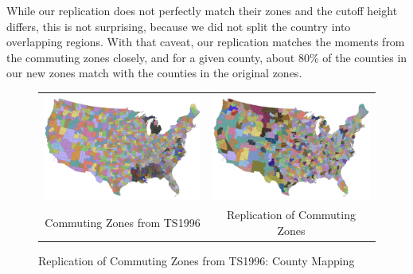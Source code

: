 While our replication does not perfectly match their zones and the cutoff height differs, this is not surprising, because we did not split the country into overlapping regions. With that caveat, our replication matches the moments from the commuting zones closely, and for a given county, about 80\% of the counties in our new zones match with the counties in the original zones.
\begin{figure}[tbh]\centering
\begin{tabular}{cc}
\includegraphics[scale=0.25]{./figures/commutingzones.png}&
\includegraphics[scale=0.25]{./figures/clustermap_jtw1990_x.png}\\
Commuting Zones from TS1996 & Replication of Commuting Zones \\
\end{tabular}
\caption{Replication of Commuting Zones from TS1996: County Mapping \label{fig:czreplication}}
\end{figure}


